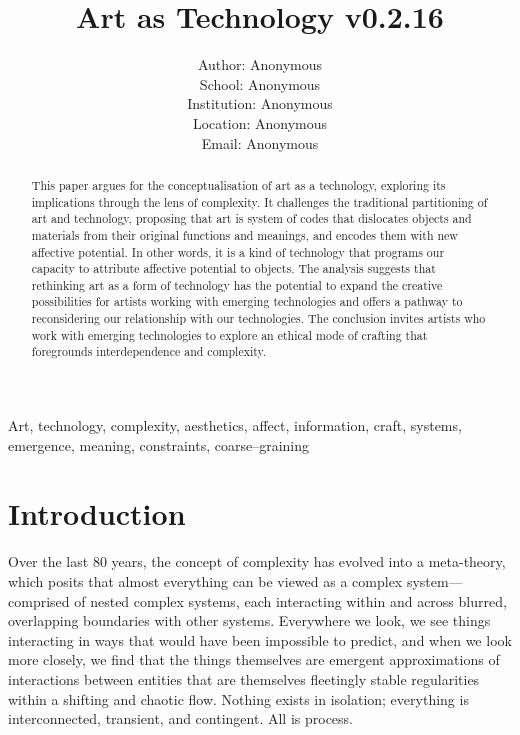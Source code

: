 \documentclass[letterpaper]{article}
\title{Art as Technology v0.2.16}
\author{Author: Anonymous\\
School: Anonymous\\
Institution: Anonymous\\
Location: Anonymous\\
Email: Anonymous\\
\newline
\newline
}
\begin{document}
 
\maketitle
\begin{abstract}

    This paper argues for the conceptualisation of art as a technology, exploring its implications through the lens of complexity. It challenges the traditional partitioning of art and technology, proposing that art is system of codes that dislocates objects and materials from their original functions and meanings, and encodes them with new affective potential. In other words, it is a kind of technology that programs our capacity to attribute affective potential to objects. The analysis suggests that rethinking art as a form of technology has the potential to expand the creative possibilities for artists working with emerging technologies and offers a pathway to reconsidering our relationship with our technologies. The conclusion invites artists who work with emerging technologies to explore an ethical mode of crafting that foregrounds interdependence and complexity.

\end{abstract}


Art, technology, complexity, aesthetics, affect, information, craft, systems, emergence, meaning, constraints, coarse–graining

\section{Introduction}

    Over the last 80 years, the concept of complexity has evolved into a meta-theory, which posits that almost everything can be viewed as a complex system—comprised of nested complex systems, each interacting within and across blurred, overlapping boundaries with other systems. Everywhere we look, we see things interacting in ways that would have been impossible to predict, and when we look more closely, we find that the things themselves are emergent approximations of interactions between entities that are themselves fleetingly stable regularities within a shifting and chaotic flow. Nothing exists in isolation; everything is interconnected, transient, and contingent. All is process.
\end{document}
